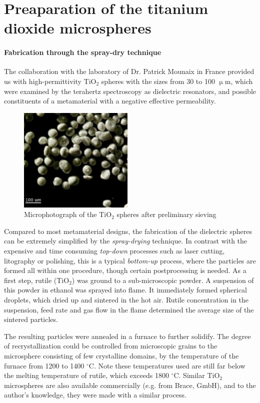
\section{Preaparation of the titanium dioxide microspheres}
\paragraph{Fabrication through the spray-dry technique}%
The collaboration with the laboratory of Dr. Patrick Mounaix in France %
provided us with high-permittivity TiO$_{2}$ spheres with the sizes from 30 to 100 $\upmu$m, which were examined by the terahertz spectroscopy as dielectric resonators, and possible constituents of a metamaterial with a negative effective permeability.
\begin{figure}[ht] \caption{Microphotograph of the TiO$_{2}$ spheres after preliminary sieving} \label{fg_microphoto} \centering 
\includegraphics[height=5cm]{img/microscope_TiO2_particles.pdf}
\end{figure}

Compared to most metamaterial designs, the fabrication of the dielectric spheres can be extremely simplified by the \textit{spray-drying} technique. In contrast with the expensive and time consuming \textit{top-down} processes such as laser cutting, litography or polishing, this is a typical \textit{bottom-up} process, where the particles are formed all within one procedure, though certain postprocessing is needed. 
As a first step, rutile (TiO$_{2}$) was ground to a sub-microscopic powder. A suspension of this powder in ethanol was sprayed into flame. It immediately formed spherical droplets, which dried up and sintered in the hot air. Rutile concentration in the suspension, feed rate and gas flow in the flame determined the average size of the sintered particles.

The resulting particles were annealed in a furnace to further solidify. The degree of recrystallization could be controlled  from microscopic grains to the microsphere consisting of few crystalline domains, by the temperature of the furnace from 1200 to 1400 $^{\circ}$C. Note these temperatures used are still far below the melting temperature of rutile, which exceeds 1800 $^{\circ}$C.
Similar TiO$_{2}$ microspheres are also available commercially (e.g. from Brace, GmbH), and to the author's knowledge, they were made with a similar process.

